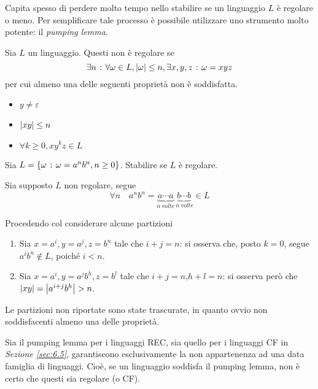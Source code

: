 \documentclass{subfiles}
\begin{document}
Capita spesso di perdere molto tempo nello stabilire se un linguaggio \(L\) è regolare o meno.
Per semplificare tale processo è possibile utilizzare uno strumento molto potente: il \emph{pumping lemma}.

\begin{Lemma}
    Sia \(L\) un linguaggio. Questi non è regolare se
    \[
        \exists n \operatorname{\: {:} \:} \forall \omega \in L, \abs{\omega} \le n, \exists x,y,z \operatorname{\: {:} \:} \omega = xyz
    \]
    per cui almeno una delle seguenti proprietà non è soddisfatta.
    \begin{multicols}{3}
        \begin{itemize}
            \item \(y \neq \varepsilon\)
            \item \(\abs{xy} \le n\)
            \item \(\forall k \ge 0, xy^{k}z \in L\)
        \end{itemize}
    \end{multicols}
\end{Lemma}

\begin{Exercise*}
    Sia \(L = \left\{\omega \operatorname{\: {:} \:} \omega = a^{n}b^{n}, n \ge 0\right\}\). Stabilire se \(L\) è regolare.
    \begin{Solution*}
        Sia supposto \(L\) non regolare, segue
        \[
            \forall n \quad a^{n}b^{n} = \underbrace{a \cdots a}_{n \ volte} \underbrace{b \cdots b}_{\ n \ volte} \in L
        \]

        \noindent Procedendo col considerare alcune partizioni
        \begin{enumerate}
            \item Sia \(x = a^{i}, y = a^{j}, z = b^{n}\) tale che \(i + j = n\):
                  si osserva che, posto \(k = 0\), segue \(a^{i}b^{n} \notin L\), poiché \(i < n\).

            \item Sia \(x = a^{i}, y = a^{j}b^{h}, z = b^{l}\) tale che \(i + j = n \text{,} h + l = n\):
                  si osserva però che \(\abs{xy} = \abs{a^{i + j}b^{h}} > n\).
        \end{enumerate}

        \begin{Note*}
            Le partizioni non riportate sono state trascurate, in quanto ovvio non soddisfacenti almeno una delle proprietà.
        \end{Note*}
    \end{Solution*}
\end{Exercise*}
\begin{Remark*}
    Sia il pumping lemma per i linguaggi REC, sia quello per i linguaggi CF in \emph{Sezione \eqref{sec:6.5}}, garantiscono esclusivamente la non appartenenza ad una data famiglia di linguaggi.
    Cioè, se un linguaggio soddisfa il pumping lemma, non è certo che questi sia regolare (o CF).
\end{Remark*}
\clearpage
\end{document}
